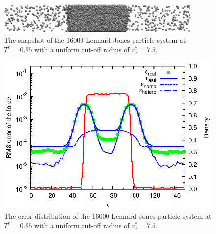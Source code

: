 \documentclass[aps,pre,preprint]{revtex4}
\begin{document}
\begin{figure}
  \centering
  \includegraphics[width=0.9\textwidth]{fig/t0.85-n16000-rc07.5uni/confout.eps}
  \caption{The snapshot of the 16000 Lennard-Jones particle system at
    $T^\ast=0.85$ with a uniform cut-off radius of $r_c^\ast = 7.5$.}
  \label{fig:tmp1}
\end{figure}

\begin{figure}
  \centering
  \includegraphics[]{fig/t0.85-n16000-rc07.5uni/error.uniform.eps}
  \caption{The error distribution of the 16000 Lennard-Jones particle
    system at $T^\ast=0.85$ with a uniform cut-off radius of $r_c^\ast
    = 7.5$.}
  \label{fig:tmp2}
\end{figure}



\end{document}
